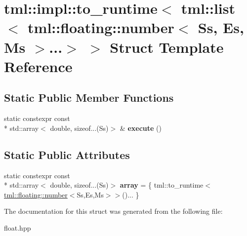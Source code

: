\hypertarget{structtml_1_1impl_1_1to__runtime_3_01tml_1_1list_3_01tml_1_1floating_1_1number_3_01Ss_00_01Es_00_01Ms_01_4_8_8_8_4_01_4}{\section{tml\+:\+:impl\+:\+:to\+\_\+runtime$<$ tml\+:\+:list$<$ tml\+:\+:floating\+:\+:number$<$ Ss, Es, Ms $>$...$>$ $>$ Struct Template Reference}
\label{structtml_1_1impl_1_1to__runtime_3_01tml_1_1list_3_01tml_1_1floating_1_1number_3_01Ss_00_01Es_00_01Ms_01_4_8_8_8_4_01_4}
}
\subsection*{Static Public Member Functions}
\begin{DoxyCompactItemize}
\item 
\hypertarget{structtml_1_1impl_1_1to__runtime_3_01tml_1_1list_3_01tml_1_1floating_1_1number_3_01Ss_00_01Es_00_01Ms_01_4_8_8_8_4_01_4_a7af777bb366d0fff6037f770a3bfda12}{static constexpr const \\*
std\+::array$<$ double, sizeof...(Ss)$>$ \& {\bfseries execute} ()}\label{structtml_1_1impl_1_1to__runtime_3_01tml_1_1list_3_01tml_1_1floating_1_1number_3_01Ss_00_01Es_00_01Ms_01_4_8_8_8_4_01_4_a7af777bb366d0fff6037f770a3bfda12}

\end{DoxyCompactItemize}
\subsection*{Static Public Attributes}
\begin{DoxyCompactItemize}
\item 
\hypertarget{structtml_1_1impl_1_1to__runtime_3_01tml_1_1list_3_01tml_1_1floating_1_1number_3_01Ss_00_01Es_00_01Ms_01_4_8_8_8_4_01_4_ab451478f5f1f92ee112ce164dd269abf}{static constexpr const \\*
std\+::array$<$ double, sizeof...(Ss)$>$ {\bfseries array} = \{ tml\+::to\+\_\+runtime$<$\hyperlink{structtml_1_1floating_1_1number}{tml\+::floating\+::number}$<$Ss,Es,Ms$>$$>$()... \}}\label{structtml_1_1impl_1_1to__runtime_3_01tml_1_1list_3_01tml_1_1floating_1_1number_3_01Ss_00_01Es_00_01Ms_01_4_8_8_8_4_01_4_ab451478f5f1f92ee112ce164dd269abf}

\end{DoxyCompactItemize}


The documentation for this struct was generated from the following file\+:\begin{DoxyCompactItemize}
\item 
float.\+hpp\end{DoxyCompactItemize}
